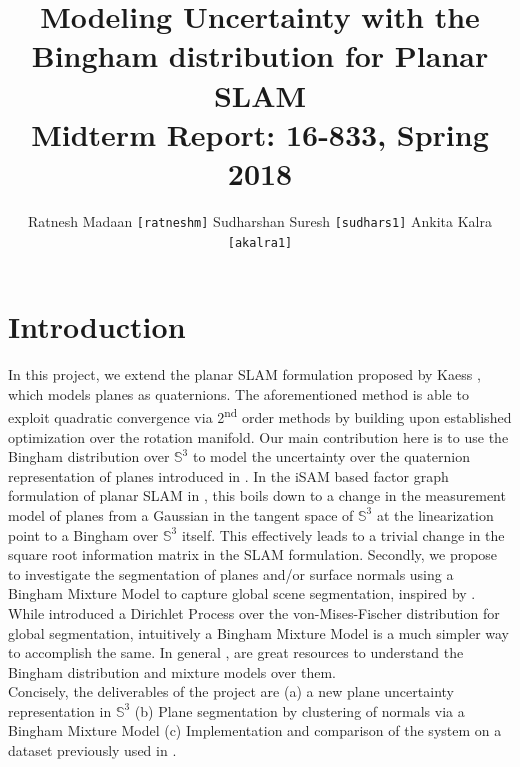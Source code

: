 \documentclass[12pt]{article}
\title{%
	Modeling Uncertainty with the Bingham distribution for Planar SLAM \\ \vspace{3mm}
  \large Midterm Report: 16-833, Spring 2018}
\author{\small{Ratnesh Madaan \texttt{[ratneshm]} \qquad Sudharshan Suresh \texttt{[sudhars1]} \qquad  Ankita Kalra \texttt{[akalra1]}}}
\date{}
\begin{document}
\maketitle

\raggedright
\justify

\vspace{-2em}


\section*{Introduction}
\label{sec:intro}
In this project, we extend the planar SLAM formulation proposed by Kaess \cite{kaess2015simultaneous}, which models planes as quaternions. The aforementioned method is able to exploit quadratic convergence via 2\textsuperscript{nd} order methods by building upon established optimization over the rotation manifold. 
Our main contribution here is to use the Bingham distribution over $\mathbb{S}^3$ to model the uncertainty over the quaternion representation of planes introduced in \cite{kaess2015simultaneous}.
In the iSAM based factor graph formulation of planar SLAM in \cite{kaess2015simultaneous}, this boils down to a change in the measurement model of planes from a Gaussian in the tangent space of $\mathbb{S}^3$ at the linearization point to a Bingham over $\mathbb{S}^3$ itself. This effectively leads to a trivial change in the square root information matrix in the SLAM formulation. 
Secondly, we propose to investigate the segmentation of planes and/or surface normals using a Bingham Mixture Model to capture global scene segmentation, inspired by \cite{straub2017direction}. 
While \cite{straub2017direction} introduced a Dirichlet Process over the von-Mises-Fischer distribution for global segmentation, intuitively a Bingham Mixture Model is a much simpler way to accomplish the same. 
In general \cite{glover2014quaternion}, \cite{glover2012monte} are great resources to understand the Bingham distribution and mixture models over them. \\

\noindent Concisely, the deliverables of the project are (a) a new plane uncertainty representation in $\mathbb{S}^3$ (b) Plane segmentation by clustering of normals via a Bingham Mixture Model (c) Implementation and comparison of the system on a dataset previously used in \cite{kaess2015simultaneous}. 
\end{document}
